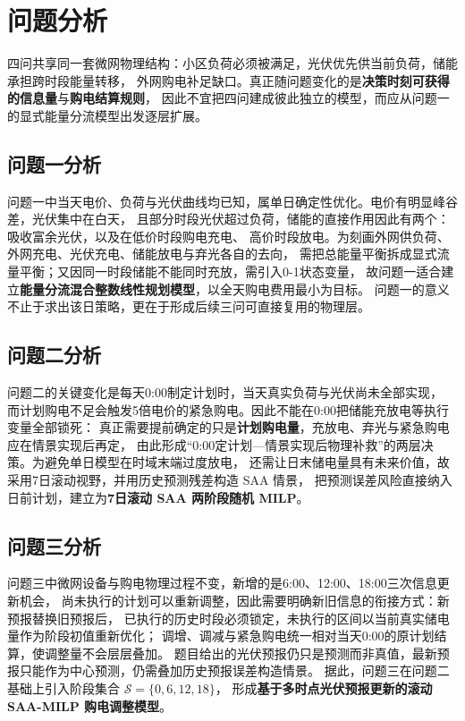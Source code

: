 \section{问题分析}

四问共享同一套微网物理结构：小区负荷必须被满足，光伏优先供当前负荷，储能承担跨时段能量转移，
外网购电补足缺口。真正随问题变化的是\textbf{决策时刻可获得的信息量}与\textbf{购电结算规则}，
因此不宜把四问建成彼此独立的模型，而应从问题一的显式能量分流模型出发逐层扩展。

\subsection{问题一分析}

问题一中当天电价、负荷与光伏曲线均已知，属单日确定性优化。电价有明显峰谷差，光伏集中在白天，
且部分时段光伏超过负荷，储能的直接作用因此有两个：吸收富余光伏，以及在低价时段购电充电、
高价时段放电。为刻画外网供负荷、外网充电、光伏充电、储能放电与弃光各自的去向，
需把总能量平衡拆成显式流量平衡；又因同一时段储能不能同时充放，需引入0-1状态变量，
故问题一适合建立\textbf{能量分流混合整数线性规划模型}，以全天购电费用最小为目标。
问题一的意义不止于求出该日策略，更在于形成后续三问可直接复用的物理层。

\subsection{问题二分析}

问题二的关键变化是每天0:00制定计划时，当天真实负荷与光伏尚未全部实现，
而计划购电不足会触发5倍电价的紧急购电。因此不能在0:00把储能充放电等执行变量全部锁死：
真正需要提前确定的只是\textbf{计划购电量}，充放电、弃光与紧急购电应在情景实现后再定，
由此形成“0:00定计划—情景实现后物理补救”的两层决策。为避免单日模型在时域末端过度放电，
还需让日末储电量具有未来价值，故采用7日滚动视野，并用历史预测残差构造 SAA 情景，
把预测误差风险直接纳入日前计划，建立为\textbf{7日滚动 SAA 两阶段随机 MILP}。

\subsection{问题三分析}

问题三中微网设备与购电物理过程不变，新增的是6:00、12:00、18:00三次信息更新机会，
尚未执行的计划可以重新调整，因此需要明确新旧信息的衔接方式：新预报替换旧预报后，
已执行的历史时段必须锁定，未执行的区间以当前真实储电量作为阶段初值重新优化；
调增、调减与紧急购电统一相对当天0:00的原计划结算，使调整量不会层层叠加。
题目给出的光伏预报仍只是预测而非真值，最新预报只能作为中心预测，仍需叠加历史预报误差构造情景。
据此，问题三在问题二基础上引入阶段集合 \(\mathcal S=\{0,6,12,18\}\)，
形成\textbf{基于多时点光伏预报更新的滚动 SAA-MILP 购电调整模型}。

